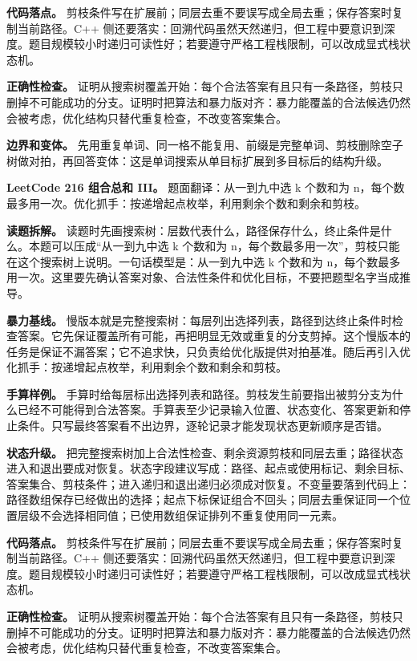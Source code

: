 \textbf{代码落点。} 剪枝条件写在扩展前；同层去重不要误写成全局去重；保存答案时复制当前路径。C++ 侧还要落实：回溯代码虽然天然递归，但工程中要意识到深度。题目规模较小时递归可读性好；若要遵守严格工程栈限制，可以改成显式栈状态机。

\textbf{正确性检查。} 证明从搜索树覆盖开始：每个合法答案有且只有一条路径，剪枝只删掉不可能成功的分支。证明时把算法和暴力版对齐：暴力能覆盖的合法候选仍然会被考虑，优化结构只替代重复检查，不改变答案集合。

\textbf{边界和变体。} 先用重复单词、同一格不能复用、前缀是完整单词、剪枝删除空子树做对拍，再回答变体：这是单词搜索从单目标扩展到多目标后的结构升级。

\noindent\textbf{LeetCode 216 组合总和 III。} 题面翻译：从一到九中选 k 个数和为 n，每个数最多用一次。优化抓手：按递增起点枚举，利用剩余个数和剩余和剪枝。

\textbf{读题拆解。} 读题时先画搜索树：层数代表什么，路径保存什么，终止条件是什么。本题可以压成“从一到九中选 k 个数和为 n，每个数最多用一次”，剪枝只能在这个搜索树上说明。一句话模型是：从一到九中选 k 个数和为 n，每个数最多用一次。这里要先确认答案对象、合法性条件和优化目标，不要把题型名字当成推导。

\textbf{暴力基线。} 慢版本就是完整搜索树：每层列出选择列表，路径到达终止条件时检查答案。它先保证覆盖所有可能，再把明显无效或重复的分支剪掉。这个慢版本的任务是保证不漏答案；它不追求快，只负责给优化版提供对拍基准。随后再引入优化抓手：按递增起点枚举，利用剩余个数和剩余和剪枝。

\textbf{手算样例。} 手算时给每层标出选择列表和路径。剪枝发生前要指出被剪分支为什么已经不可能得到合法答案。手算表至少记录输入位置、状态变化、答案更新和停止条件。只写最终答案看不出边界，逐轮记录才能发现状态更新顺序是否错。

\textbf{状态升级。} 把完整搜索树加上合法性检查、剩余资源剪枝和同层去重；路径状态进入和退出要成对恢复。状态字段建议写成：路径、起点或使用标记、剩余目标、答案集合、剪枝条件；进入递归和退出递归必须成对恢复。不变量要落到代码上：路径数组保存已经做出的选择；起点下标保证组合不回头；同层去重保证同一个位置层级不会选择相同值；已使用数组保证排列不重复使用同一元素。

\textbf{代码落点。} 剪枝条件写在扩展前；同层去重不要误写成全局去重；保存答案时复制当前路径。C++ 侧还要落实：回溯代码虽然天然递归，但工程中要意识到深度。题目规模较小时递归可读性好；若要遵守严格工程栈限制，可以改成显式栈状态机。

\textbf{正确性检查。} 证明从搜索树覆盖开始：每个合法答案有且只有一条路径，剪枝只删掉不可能成功的分支。证明时把算法和暴力版对齐：暴力能覆盖的合法候选仍然会被考虑，优化结构只替代重复检查，不改变答案集合。

